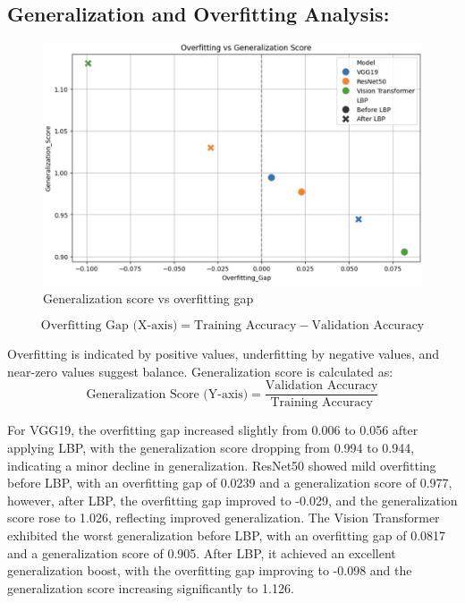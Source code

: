 \documentclass{ijclclp}
\begin{document}
\begin{flushleft}
    \subsection{Generalization and Overfitting Analysis:}
    \begin{figure}[H]
    \centering
    \includegraphics[width=0.7\linewidth]{image23.png}
    \caption{Generalization score vs overfitting gap}
\end{figure}

\begingroup
\sloppy
\begin{equation}
\text{Overfitting Gap (X-axis)} = \text{Training Accuracy} - \text{Validation Accuracy}
\label{eq:overfitting_gap}
\end{equation}

\endgroup

\begin{flushleft}
Overfitting is indicated by positive values, underfitting by negative values, and near-zero values suggest balance. Generalization score is calculated as:
\begin{equation}
\text{Generalization Score (Y-axis)} = \frac{\text{Validation Accuracy}}{\text{Training Accuracy}}
\label{eq:generalization_score}
\end{equation}


For VGG19, the overfitting gap increased slightly from 0.006 to 0.056 after applying LBP, with the generalization score dropping from 0.994 to 0.944, indicating a minor decline in generalization. ResNet50 showed mild overfitting before LBP, with an overfitting gap of 0.0239 and a generalization score of 0.977, however, after LBP, the overfitting gap improved to -0.029, and the generalization score rose to 1.026, reflecting improved generalization. The Vision Transformer exhibited the worst generalization before LBP, with an overfitting gap of 0.0817 and a generalization score of 0.905. After LBP, it achieved an excellent generalization boost, with the overfitting gap improving to -0.098 and the generalization score increasing significantly to 1.126.
\end{flushleft}
\end{flushleft}
\end{document}
